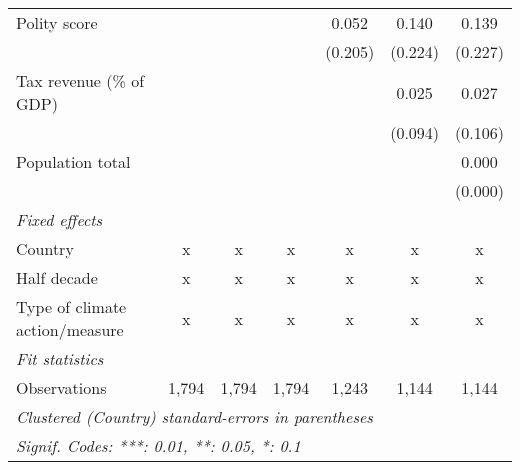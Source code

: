 \begin{tabular}{lcccccc}
   Polity score                                                     &               &               &              & 0.052       & 0.140       & 0.139\\   
                                                                    &               &               &              & (0.205)     & (0.224)     & (0.227)\\   
   Tax revenue (\% of GDP)                                          &               &               &              &             & 0.025       & 0.027\\   
                                                                    &               &               &              &             & (0.094)     & (0.106)\\   
   Population total                                                 &               &               &              &             &             & 0.000\\   
                                                                    &               &               &              &             &             & (0.000)\\   
   \emph{Fixed effects}\\
   Country                                                          & x             & x             & x            & x           & x           & x\\  
   Half decade                                                      & x             & x             & x            & x           & x           & x\\  
   Type of climate action/measure                                   & x             & x             & x            & x           & x           & x\\  
   \midrule \emph{Fit statistics}\\
   Observations                                                     & 1,794         & 1,794         & 1,794        & 1,243       & 1,144       & 1,144\\  
   \midrule
   \multicolumn{7}{l}{\emph{Clustered (Country) standard-errors in parentheses}}\\
   \multicolumn{7}{l}{\emph{Signif. Codes: ***: 0.01, **: 0.05, *: 0.1}}\\
\end{tabular}
\par\endgroup


